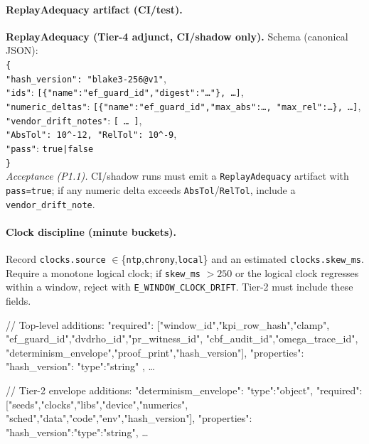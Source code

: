 \documentclass[10pt]{article}
\providecommand{\AbsTol}{10^{-12}}
\providecommand{\RelTol}{10^{-9}}
\begin{document}
\paragraph{ReplayAdequacy artifact (CI/test).}
\begin{ledgerbox}
\textbf{ReplayAdequacy (Tier-4 adjunct, CI/shadow only).}
Schema (canonical JSON):\\
\texttt{\{} \\
\quad \texttt{"hash\_version": "blake3-256@v1"},\\
\quad \texttt{"ids"}: \texttt{[\{"name":"ef\_guard\_id","digest":"…"\}, …]},\\
\quad \texttt{"numeric\_deltas"}: \texttt{[\{"name":"ef\_guard\_id","max\_abs":…, "max\_rel":…\}, …]},\\
\quad \texttt{"vendor\_drift\_notes"}: \texttt{[\,…\,]},\\
\quad \texttt{"AbsTol": \AbsTol, "RelTol": \RelTol},\\
\quad \texttt{"pass"}: \texttt{true|false} \\
\texttt{\}}\\
\emph{Acceptance (P1.1).} CI/shadow runs must emit a \texttt{ReplayAdequacy} artifact with \texttt{pass=true};
if any numeric delta exceeds \texttt{AbsTol}/\texttt{RelTol}, include a \texttt{vendor\_drift\_note}.
\end{ledgerbox}

\paragraph{Clock discipline (minute buckets).}
Record \texttt{clocks.source} $\in$\{\texttt{ntp},\texttt{chrony},\texttt{local}\} and an estimated \texttt{clocks.skew\_ms}.
Require a monotone logical clock; if \texttt{skew\_ms} $>250$ or the logical clock regresses within a window,
reject with \texttt{E\_WINDOW\_CLOCK\_DRIFT}. Tier-2 must include these fields.

// Top-level additions:
"required": ["window_id","kpi_row_hash","clamp",
             "ef_guard_id","dvdrho_id","pr_witness_id",
             "cbf_audit_id","omega_trace_id",
             "determinism_envelope","proof_print","hash_version"],
"properties": {
  "hash_version": {"type":"string"} ,
  …
}

// Tier-2 envelope additions:
"determinism_envelope": {
  "type":"object",
  "required": ["seeds","clocks","libs","device","numerics",
               "sched","data","code","env","hash_version"],
  "properties": {
    "hash_version":{"type":"string"},
    …
  }
}
\end{document}
